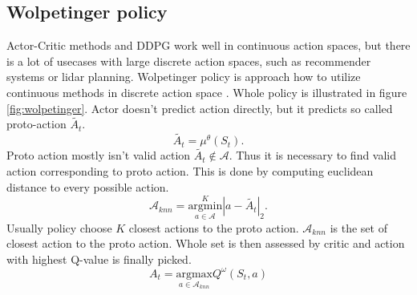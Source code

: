 \subsection{Wolpetinger policy}
Actor-Critic methods and DDPG work well in continuous action spaces, but there is a lot of usecases with large discrete action spaces, such as recommender systems or lidar planning. Wolpetinger policy is approach how to utilize continuous methods in discrete action space \cite{dulac2015}. Whole policy is illustrated in figure \ref{fig:wolpetinger}. Actor doesn't predict action directly, but it predicts so called proto-action $\tilde{A_t}$.
\begin{equation}
\tilde{A_t} = \mu^\theta(S_t).
\end{equation}
Proto action mostly isn't valid action $\tilde{A_t} \notin \mathcal{A}$. Thus it is necessary to find valid action corresponding to proto action. This is done by computing euclidean distance to every possible action.
\begin{equation} \label{eq:knn}
\mathcal{A}_{knn} = \overset{K}{\underset{a \in \mathcal{A}}{{\text{argmin}}}} | a - \tilde{A_t} |_2 .
\end{equation}
Usually policy choose $K$ closest actions to the proto action. $\mathcal{A}_{knn}$ is the set of closest action to the proto action. Whole set is then assessed by critic and action with highest Q-value is finally picked.
\begin{equation}
A_t = \underset{a \in \mathcal{A}_{knn}}{\text{argmax}} Q^\omega(S_t, a)
\end{equation}
